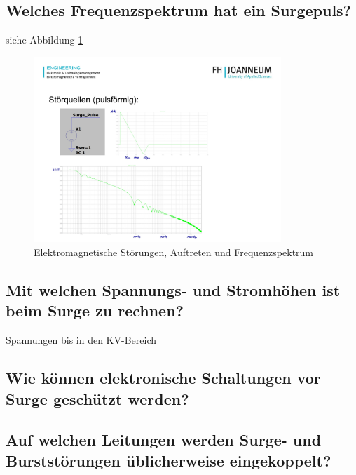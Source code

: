 \subsection{Welches Frequenzspektrum hat ein Surgepuls?}
siehe Abbildung \ref{fig:lv4:surge_puls}
\begin{figure}[ht]
  \centering
  \includegraphics[height=7cm]{src/assets/pictures/lv4_surge_pulse.jpg}
  \caption{Elektromagnetische Störungen, Auftreten und Frequenzspektrum}\label{fig:lv4:surge_puls}
\end{figure}

\subsection{Mit welchen Spannungs- und Stromhöhen ist beim Surge zu rechnen?}
Spannungen bis in den KV-Bereich

\subsection{Wie können elektronische Schaltungen vor Surge geschützt werden?}

\subsection{Auf welchen Leitungen werden Surge- und Burststörungen üblicherweise eingekoppelt?}

\pagebreak
